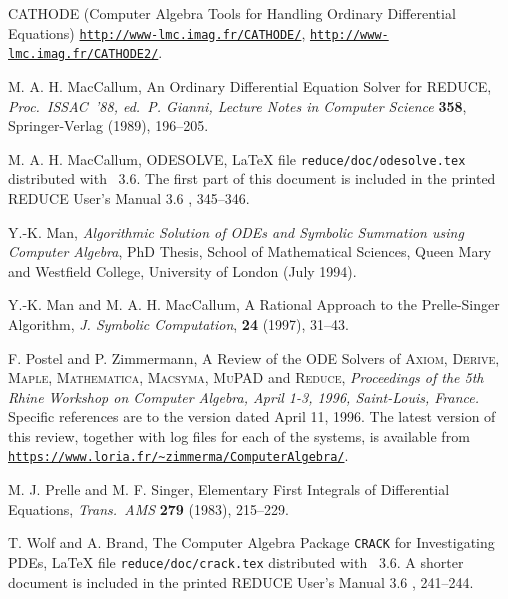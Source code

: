 \begin{thebibliography}{999}

 CATHODE (Computer Algebra Tools for Handling
Ordinary Differential Equations)
\href{http://www-lmc.imag.fr/CATHODE/}%
{\texttt{http://www-lmc.imag.fr/CATHODE/}},
\href{http://www-lmc.imag.fr/CATHODE2/}%
{\texttt{http://www-lmc.imag.fr/CATHODE2/}}.


 M. A. H. MacCallum, An Ordinary Differential
Equation Solver for REDUCE, \textit{Proc.\ ISSAC~'88, ed.\ P. Gianni,
Lecture Notes in Computer Science} \textbf{358}, Springer-Verlag
(1989), 196--205.

 M. A. H. MacCallum, ODESOLVE, \LaTeX{} file
\texttt{reduce/doc/odesolve.tex} distributed with \REDUCE~3.6.  The
first part of this document is included in the printed REDUCE User's
Manual 3.6 \cite{Hearn:91}, 345--346.

 Y.-K. Man, \textit{Algorithmic Solution of ODEs and
Symbolic Summation using Computer Algebra}, PhD Thesis, School of
Mathematical Sciences, Queen Mary and Westfield College, University of
London (July 1994).

 Y.-K. Man and M. A. H. MacCallum, A Rational
Approach to the Prelle-Singer Algorithm, \textit{J. Symbolic
Computation}, \textbf{24} (1997), 31--43.

 F. Postel and P. Zimmermann, A Review of the ODE
Solvers of \textsc{Axiom}, \textsc{Derive}, \textsc{Maple},
\textsc{Mathematica}, \textsc{Macsyma}, \textsc{MuPAD} and
\textsc{Reduce}, \textit{Proceedings of the 5th Rhine Workshop on
Computer Algebra, April 1-3, 1996, Saint-Louis, France.}
Specific references are to the version dated April 11, 1996.
The latest version of this review, together with log files for each of
the systems, is available from
\href{https://www.loria.fr/~zimmerma/ComputerAlgebra/}%
{\texttt{https://www.loria.fr/\textasciitilde zimmerma/ComputerAlgebra/}}.

 M. J. Prelle and M. F. Singer, Elementary
First Integrals of Differential Equations, \textit{Trans.\ AMS}
\textbf{279} (1983), 215--229.

 T. Wolf and A. Brand, The Computer Algebra Package
\texttt{CRACK} for Investigating PDEs, \LaTeX{} file
\texttt{reduce/doc/crack.tex} distributed with \REDUCE~3.6.  A shorter
document is included in the printed REDUCE User's Manual 3.6
\cite{Hearn:91}, 241--244.


\end{thebibliography}
